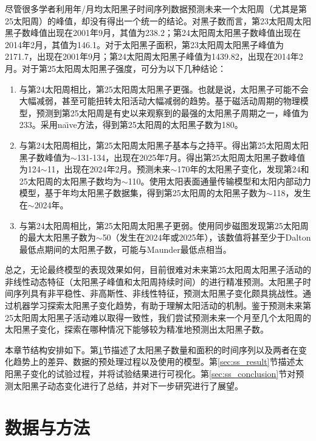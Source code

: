 尽管很多学者利用年/月均太阳黑子时间序列数据预测未来一个太阳周（尤其是第25太阳周）的峰值，却没有得出一个统一的结论。对黑子数而言，第23太阳周太阳黑子数峰值出现在2001年9月，其值为238.2；第24太阳周太阳黑子数峰值出现在2014年2月，其值为146.1。对于太阳黑子面积，第23太阳周太阳黑子峰值为2171.7，出现在2001年9月；第24太阳周太阳黑子峰值为1439.82，出现在2014年2月。对于第25太阳周太阳黑子强度，可分为以下几种结论：
\begin{enumerate}
  \item 与第24太阳周相比，第25太阳周太阳黑子更强。也就是说，太阳黑子可能不会大幅减弱，甚至可能扭转太阳活动大幅减弱的趋势。\citet{mcintosh2020overlapping}基于磁活动周期的物理模型，预测到第25太阳周是有史以来观察到的最强的太阳黑子周期之一，峰值为233。\citet{pesnell2018effects}采用na{\"\i}ve方法，得到第25太阳周的太阳黑子数为180。
  \item 与第24太阳周相比，第25太阳周太阳黑子基本与之持平。\citet{bisoi2020another}得出第25太阳周太阳黑子数峰值为$\sim$131-134，出现在2025年7月。\citet{singh2019prediction}得出第25太阳周太阳黑子数峰值为124$\sim$11，出现在2024年2月。\citet{hiremath2008prediction}预测未来$\sim$170年的太阳黑子变化，发现第24和25太阳周的太阳黑子数均为$\sim$110。\citet{bhowmik2018prediction}使用太阳表面通量传输模型和太阳内部动力模型，基于年均太阳黑子数据集，得到第25太阳周的太阳黑子数为$\sim$118，发生在$\sim$2024年。
  \item 与第24太阳周相比，第25太阳周太阳黑子更弱。\citep{kitiashvili2020application}使用同步磁图发现第25太阳周的最大太阳黑子数为$\sim$50（发生在2024年或2025年），该数值将甚至少于Dalton最低点期间的太阳黑子数，可能与Maunder最低点相当。
\end{enumerate}

总之，无论最终模型的表现效果如何，目前很难对未来第25太阳周太阳黑子活动的非线性动态特征（太阳黑子峰值和太阳周持续时间）的进行精准预测。太阳黑子时间序列具有非平稳性、非高斯性、非线性特征，预测太阳黑子变化颇具挑战性。通过机器学习探索太阳黑子变化趋势，有助于理解太阳活动的机制。鉴于预测未来第25太阳周太阳黑子活动难以取得一致性，我们尝试预测未来一个月至几个太阳周的太阳黑子变化，探索在哪种情况下能够较为精准地预测出太阳黑子数。

本章节结构安排如下。第\ref{sec:ss_data_method}节描述了太阳黑子数量和面积的时间序列以及两者在变化趋势上的差异、数据的预处理过程以及使用的模型。第\ref{sec:ss_result}节描述太阳黑子变化的试验过程，并将试验结果进行可视化。第\ref{sec:ss_conclusion}节对预测太阳黑子动态变化进行了总结，并对下一步研究进行了展望。

\section{数据与方法}\label{sec:ss_data_method}

